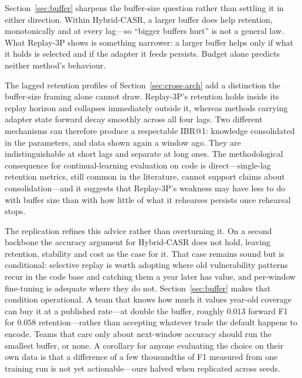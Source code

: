 
Section~\ref{sec:buffer} sharpens the buffer-size question rather than settling it in either direction. Within Hybrid-CASR, a larger buffer does help retention, monotonically and at every lag---so ``bigger buffers hurt'' is not a general law. What Replay-3P shows is something narrower: a larger buffer helps only if what it holds is selected and if the adapter it feeds persists. Budget alone predicts neither method's behaviour.

The lagged retention profiles of Section~\ref{sec:cross-arch} add a distinction the buffer-size framing alone cannot draw. Replay-3P's retention holds inside its replay horizon and collapses immediately outside it, whereas methods carrying adapter state forward decay smoothly across all four lags. Two different mechanisms can therefore produce a respectable IBR@1: knowledge consolidated in the parameters, and data shown again a window ago. They are indistinguishable at short lags and separate at long ones. The methodological consequence for continual-learning evaluation on code is direct---single-lag retention metrics, still common in the literature, cannot support claims about consolidation---and it suggests that Replay-3P's weakness may have less to do with buffer size than with how little of what it rehearses persists once rehearsal stops.



The replication refines this advice rather than overturning it. On a second backbone the accuracy argument for Hybrid-CASR does not hold, leaving retention, stability and cost as the case for it. That case remains sound but is conditional: selective replay is worth adopting where old vulnerability patterns recur in the code base and catching them a year later has value, and per-window fine-tuning is adequate where they do not. Section~\ref{sec:buffer} makes that condition operational. A team that knows how much it values year-old coverage can buy it at a published rate---at double the buffer, roughly $0.013$ forward F1 for $0.058$ retention---rather than accepting whatever trade the default happens to encode. Teams that care only about next-window accuracy should run the smallest buffer, or none. A corollary for anyone evaluating the choice on their own data is that a difference of a few thousandths of F1 measured from one training run is not yet actionable---ours halved when replicated across seeds.



